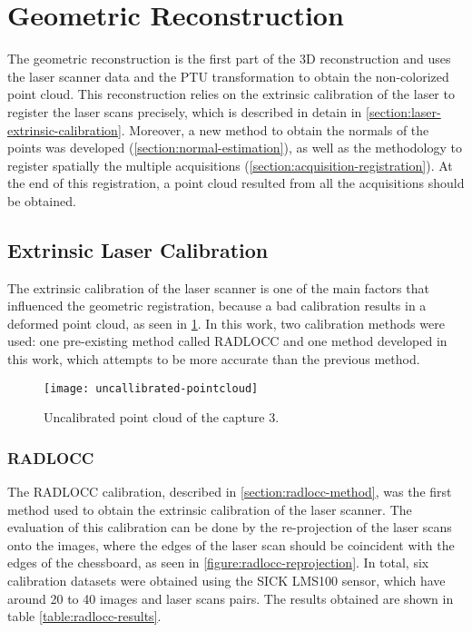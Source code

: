 \section{Geometric Reconstruction}

The geometric reconstruction is the first part of the 3D reconstruction and uses the laser scanner data and the PTU transformation to obtain the non-colorized point cloud. This reconstruction relies on the extrinsic calibration of the laser to register the laser scans precisely, which is described in detain in \cref{section:laser-extrinsic-calibration}. Moreover, a new method to obtain the normals of the points was developed (\cref{section:normal-estimation}), as well as the methodology to register spatially the multiple acquisitions (\cref{section:acquisition-registration}). At the end of this registration, a point cloud resulted from all the acquisitions should be obtained.



\subsection{Extrinsic Laser Calibration}

The extrinsic calibration of the laser scanner is one of the main factors that influenced the geometric registration, because a bad calibration results in a deformed point cloud, as seen in \cref{figure:uncallibrated-pointcloud}. In this work, two calibration methods were used: one pre-existing method called RADLOCC and one method developed in this work, which attempts to be more accurate than the previous method. 

\begin{figure}[h]
    
    \centering
    \texttt{[image: uncallibrated-pointcloud]}

    \caption{Uncalibrated point cloud of the capture 3.}
    \label{figure:uncallibrated-pointcloud}

\end{figure}

\subsubsection{RADLOCC}

The RADLOCC calibration, described in \cref{section:radlocc-method}, was the first method used to obtain the extrinsic calibration of the laser scanner. The evaluation of this calibration can be done by the re-projection of the laser scans onto the images, where the edges of the laser scan should be coincident with the edges of the chessboard, as seen in \cref{figure:radlocc-reprojection}. In total, six calibration datasets were obtained using the SICK LMS100 sensor, which have around 20 to 40 images and laser scans pairs. The results obtained are shown in table \cref{table:radlocc-results}.

